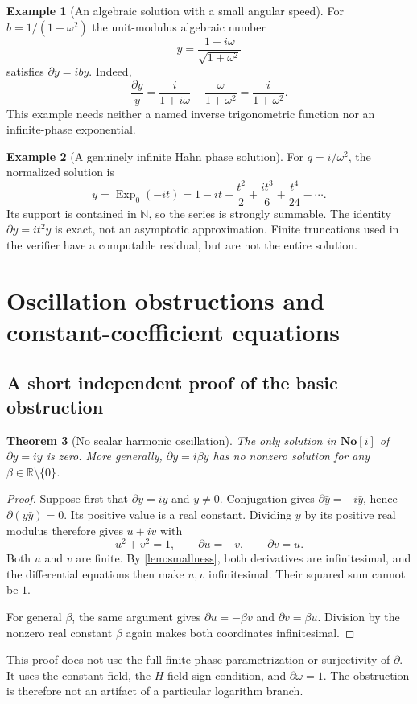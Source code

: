 \documentclass[11pt,a4paper]{article}
\newtheorem{theorem}{Theorem}[section]
\theoremstyle{definition}
\newtheorem{example}[theorem]{Example}
\newcommand{\SC}{\mathbf{No}[i]}
\newcommand{\R}{\mathbb R}
\newcommand{\N}{\mathbb N}
\newcommand{\D}{\partial}
\newcommand{\Expzero}{\operatorname{Exp}_0}
\numberwithin{equation}{section}
\begin{document}
\begin{example}[An algebraic solution with a small angular speed]
\label{ex:algebraicphase}
For $b=1/(1+\omega^2)$ the unit-modulus algebraic number
\[
 y=\frac{1+i\omega}{\sqrt{1+\omega^2}}
\]
satisfies $\D y=iby$. Indeed,
\[
 \frac{\D y}{y}
 =\frac{i}{1+i\omega}-\frac{\omega}{1+\omega^2}
 =\frac{i}{1+\omega^2}.
\]
This example needs neither a named inverse trigonometric function nor an
infinite-phase exponential.
\end{example}

\begin{example}[A genuinely infinite Hahn phase solution]
For $q=i/\omega^2$, the normalized solution is
\[
 y=\Expzero(-it)
 =1-it-\frac{t^2}{2}+\frac{it^3}{6}+\frac{t^4}{24}-\cdots.
\]
Its support is contained in $\N$, so the series is strongly summable.
The identity $\D y=it^2y$ is exact, not an asymptotic approximation.
Finite truncations used in the verifier have a computable residual, but
are not the entire solution.
\end{example}

\section{Oscillation obstructions and constant-coefficient equations}
\label{sec:constant}

\subsection{A short independent proof of the basic obstruction}
\begin{theorem}[No scalar harmonic oscillation]\label{thm:noosc}
The only solution in $\SC$ of $\D y=iy$ is zero. More generally,
$\D y=i\beta y$ has no nonzero solution for any
$\beta\in\R\setminus\{0\}$.
\end{theorem}
\begin{proof}
Suppose first that $\D y=iy$ and $y\ne0$. Conjugation gives
$\D\bar y=-i\bar y$, hence
$\D(y\bar y)=0$. Its positive value is a real constant. Dividing $y$ by
its positive real modulus therefore gives $u+iv$ with
\[
 u^2+v^2=1,\qquad \D u=-v,\qquad\D v=u.
\]
Both $u$ and $v$ are finite. By \cref{lem:smallness}, both derivatives
are infinitesimal, and the differential equations then make $u,v$
infinitesimal. Their squared sum cannot be $1$.

For general $\beta$, the same argument gives
$\D u=-\beta v$ and $\D v=\beta u$. Division by the nonzero real
constant $\beta$ again makes both coordinates infinitesimal.
\end{proof}
This proof does not use the full finite-phase parametrization or
surjectivity of $\D$. It uses the constant field, the $H$-field sign
condition, and $\D\omega=1$. The obstruction is therefore not an artifact
of a particular logarithm branch.
\end{document}
